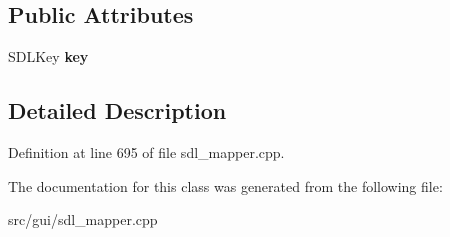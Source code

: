 \subsection*{Public Attributes}
\begin{DoxyCompactItemize}
\item 
\hypertarget{classCKeyBind_a5db2e06f00521cdcd4bdf961cb02c336}{S\-D\-L\-Key {\bfseries key}}\label{classCKeyBind_a5db2e06f00521cdcd4bdf961cb02c336}

\end{DoxyCompactItemize}


\subsection{Detailed Description}


Definition at line 695 of file sdl\-\_\-mapper.\-cpp.



The documentation for this class was generated from the following file\-:\begin{DoxyCompactItemize}
\item 
src/gui/sdl\-\_\-mapper.\-cpp\end{DoxyCompactItemize}
